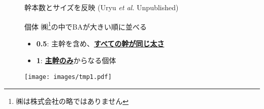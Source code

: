 \documentclass[a0, 30pt, plainboxedsections, draft]{sciposter} %
\begin{document}
\begin{multicols}{2}
\vspace{-2em}\begin{figure}
 \begin{minipage}{0.6\hsize}
幹本数とサイズを反映 {\small(Uryu \textit{et al.} Unpublished)}

個体 ㈱\footnote{ ㈱は株式会社の略ではありません}の中でBAが大きい順に並べる

\begin{itemize}\setlength{\itemindent}{0.6em}
  \item \textbf{0.5}: 主幹を含め、\textbf{\underline{すべての幹が同じ太さ}}
  \item \textbf{1}: \textbf{\underline{主幹のみ}}からなる個体
\end{itemize}
 \end{minipage}
 \begin{minipage}{0.4\hsize}
  \centering
   \texttt{[image: images/tmp1.pdf]}  
 \end{minipage}
\end{figure}

\end{multicols}
\begin{mdframed}[style=section.frame]
  \centering\LARGE\textbf{\color{white}{結果}}
\end{mdframed}\vspace{-1.2em}
\end{document}
